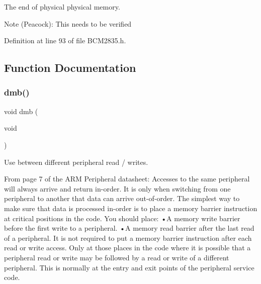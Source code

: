 The end of physical physical memory. 

\begin{DoxyNote}{Note}
(Peacock)\+: This needs to be verified 
\end{DoxyNote}


Definition at line 93 of file B\+C\+M2835.\+h.



\subsection{Function Documentation}
\mbox{\label{group__Peripherals_ga5e0e58b5a11a26c6eb46b74716e8801b}} 
\subsubsection{\texorpdfstring{dmb()}{dmb()}}
{\footnotesize\ttfamily void dmb (\begin{DoxyParamCaption}\item[{void}]{ }\end{DoxyParamCaption})}



Use between different peripheral read / writes. 

From page 7 of the A\+RM Peripheral datasheet\+: Accesses to the same peripheral will always arrive and return in-\/order. It is only when switching from one peripheral to another that data can arrive out-\/of-\/order. The simplest way to make sure that data is processed in-\/order is to place a memory barrier instruction at critical positions in the code. You should place\+: •A memory write barrier before the first write to a peripheral. •A memory read barrier after the last read of a peripheral. It is not required to put a memory barrier instruction after each read or write access. Only at those places in the code where it is possible that a peripheral read or write may be followed by a read or write of a different peripheral. This is normally at the entry and exit points of the peripheral service code. 